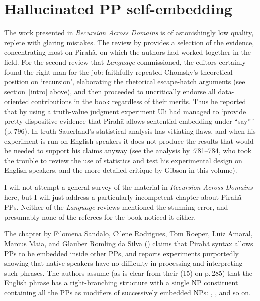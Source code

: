 \documentclass[output=paper,colorlinks,citecolor=brown
]{langscibook}
\begin{document}
\section{Hallucinated PP self-embedding}\label{ppsection}

The work presented in \textit{Recursion Across Domains} \citep{AmMaNeRo18}
is of astonishingly low quality, replete with glaring mistakes. The review
by \citet{EverGibs19} provides a selection of the evidence, concentrating
most on Pirah{\~a}, on which the authors had worked together in the field.
For the second review that \textit{Language} commissioned, the editors
certainly found the right man for the job: \citet{Hornstein19} faithfully
repeated Chomsky's theoretical position on `recursion', elaborating
the rhetorical escape-hatch arguments (see section~\ref{intro} above),
and then proceeded to uncritically endorse all data-oriented contributions
in the book regardless of their merits. Thus he reported that by using a
truth-value judgment experiment Uli \citet{Sauerland18} had managed to
`provide pretty dispositive evidence that Pirah{\~a} allows sentential
embedding under ``say''\,' (p.\,796). In truth Sauerland's statistical
analysis has vitiating flaws, and when his experiment is run on English
speakers it does not produce the results that would be needed to
support his claims anyway (see the analysis by
\citealt{EverGibs19}:781--784, who took the trouble to review the use
of statistics and test his experimental design on English speakers,
and the more detailed critique by Gibson in this volume).

I will not attempt a general survey of the material in
\textit{Recursion Across Domains} here, but I will just address a
particularly incompetent chapter about Pirah{\~a} PPs. Neither of
the \textit{Language} reviews mentioned the stunning error, and
presumably none of the referees for the book noticed it either.

The chapter by Filomena Sandalo, Cilene Rodrigues, Tom Roeper, Luiz Amaral,
Marcus Maia, and Glauber Romling da Silva (\citeyear{SandaloEtAl18})
claims that Pirah{\~a} syntax allows PPs to be embedded inside other PPs,
and reports experiments purportedly showing that native speakers have no
difficulty in processing and interpreting such phrases. The authors assume
(as is clear from their (15) on p.\,285) that the English phrase
 has a
right-branching structure with a single NP constituent containing
all the PPs as modifiers of successively embedded NPs:
,
, and so on.
\end{document}
